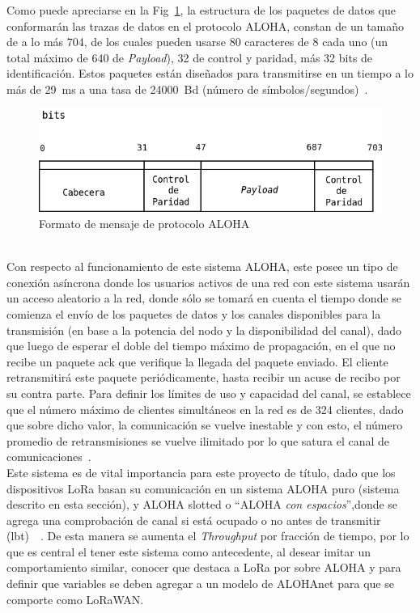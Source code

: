 \begin{justify}
Como puede apreciarse en la Fig~\ref{aloha:msg}, la estructura de los paquetes de datos que conformarán las trazas de datos en el protocolo ALOHA, constan de un tamaño de a lo más \SI{704}{\bit}, de los cuales pueden usarse \num{80} caracteres de \SI{8}{\bit} cada uno (un total máximo de \SI{640}{\bit} de \textit{Payload}), \SI{32}{\bit} de control y paridad, más 32 bits de identificación. Estos paquetes están diseñados para transmitirse en un tiempo a lo más de \SI{29}{\milli\second} a una tasa de \SI{24000}{Bd} (número de símbolos/segundos)~\cite{NORMAN}.\\
\begin{figure}[!ht]
\centering
\includegraphics[scale=0.5]{images/alohamsg.png}
\caption{Formato de mensaje de protocolo ALOHA}
\label{aloha:msg}
\end{figure}\\
Con respecto al funcionamiento de este sistema ALOHA, este posee un tipo de conexión asíncrona donde los usuarios activos de una red con este sistema usarán un acceso aleatorio a la red, donde sólo se tomará en cuenta el tiempo donde se comienza el envío de los paquetes de datos y los canales disponibles para la transmisión (en base a la potencia del nodo y la disponibilidad del canal), dado que luego de esperar el doble del tiempo máximo de propagación, en el que  no recibe un paquete \gls{ack} que verifique la llegada del paquete enviado. El cliente retransmitirá este paquete periódicamente, hasta recibir un acuse de recibo por su contra parte. Para definir los límites de uso y capacidad del canal, se establece que el número máximo de clientes simultáneos en la red es de \num{324} clientes, dado que sobre dicho valor, la comunicación se vuelve inestable y con esto, el número promedio de retransmisiones se vuelve ilimitado por lo que satura el canal de comunicaciones~\cite{NORMAN}.\\
Este sistema es de vital importancia para este proyecto de título, dado que los dispositivos LoRa basan su comunicación en un sistema ALOHA puro (sistema descrito en esta sección), y ALOHA slotted o ``ALOHA \textit{con espacios}'',donde se agrega una comprobación de canal si está ocupado o no antes de transmitir (\gls{lbt})~\cite{Sornin}~\cite{Sornin2}. De esta manera se aumenta el \textit{Throughput} por fracción de tiempo, por lo que es central el tener este sistema como antecedente, al desear imitar un comportamiento similar, conocer que destaca a LoRa por sobre ALOHA y para definir que variables se deben agregar a un modelo de ALOHAnet para que se comporte como LoRaWAN.

\end{justify}
